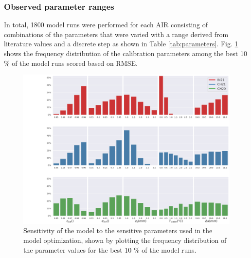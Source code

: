 \documentclass[utf8]{frontiersSCNS} %
\begin{document}
\subsubsection{Observed parameter ranges}
In total, 1800 model runs were performed for each AIR consisting of combinations of the parameters that were varied with a range
derived from literature values and a discrete step as shown in Table \ref{tab:parameters}. Fig. \ref{fig:param_hist}
shows the frequency distribution of the calibration parameters among the best 10 \% of the model runs scored based on RMSE.

\begin{figure}
	\begin{center}
		\includegraphics[width=\linewidth]{Figures/param_hist.jpg}
	\end{center}
	\caption{Sensitivity of the model to the sensitive parameters used in the model optimization, shown by plotting the frequency
		distribution of the parameter values for the best 10 \% of the model runs. } \label{fig:param_hist} \end{figure}
\end{document}
